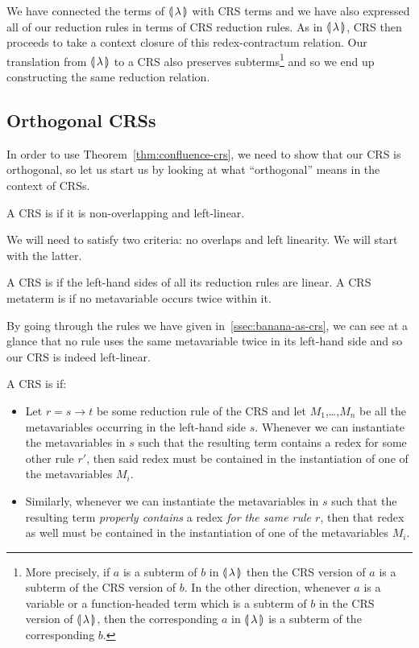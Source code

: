 We have connected the terms of $\llparenthesis \, \lambda \, \rrparenthesis$ with CRS terms and we
have also expressed all of our reduction rules in terms of CRS reduction
rules. As in $\llparenthesis \, \lambda \, \rrparenthesis$, CRS then proceeds to take a context
closure of this redex-contractum relation. Our translation from
$\llparenthesis \, \lambda \, \rrparenthesis$ to a CRS also preserves subterms\footnote{More
  precisely, if $a$ is a subterm of $b$ in $\llparenthesis \, \lambda \, \rrparenthesis$ then the CRS
  version of $a$ is a subterm of the CRS version of $b$. In the other
  direction, whenever $a$ is a variable or a function-headed term which is
  a subterm of $b$ in the CRS version of $\llparenthesis \, \lambda \, \rrparenthesis$, then the
  corresponding $a$ in $\llparenthesis \, \lambda \, \rrparenthesis$ is a subterm of the corresponding
  $b$.}  and so we end up constructing the same reduction relation.


\subsection{Orthogonal CRSs}
\label{ssec:orthogonal-crs}

In order to use Theorem~\ref{thm:confluence-crs}, we need to show that our
CRS is orthogonal, so let us start us by looking at what ``orthogonal''
means in the context of CRSs.

\begin{definition}
  A CRS is  if it is non-overlapping and left-linear.
\end{definition}

We will need to satisfy two criteria: no overlaps and left linearity. We
will start with the latter.

\begin{definition}
  A CRS is  if the left-hand sides of all its reduction
  rules are linear. A CRS metaterm is  if no metavariable
  occurs twice within it.
\end{definition}

By going through the rules we have given in~\ref{ssec:banana-as-crs}, we
can see at a glance that no rule uses the same metavariable twice in its
left-hand side and so our CRS is indeed left-linear.

\begin{definition}
  A CRS is  if:
  \begin{itemize}
    \item Let $r = s \to t$ be some reduction rule of the CRS and let
      $M_1$,\ldots,$M_n$ be all the metavariables occurring in the
      left-hand side $s$. Whenever we can instantiate the metavariables in
      $s$ such that the resulting term contains a redex for some other rule
      $r'$, then said redex must be contained in the instantiation of one
      of the metavariables $M_i$.
    \item Similarly, whenever we can instantiate the metavariables in $s$
      such that the resulting term \emph{properly contains} a redex
      \emph{for the same rule $r$}, then that redex as well must be
      contained in the instantiation of one of the metavariables $M_i$.
  \end{itemize}
\end{definition}

